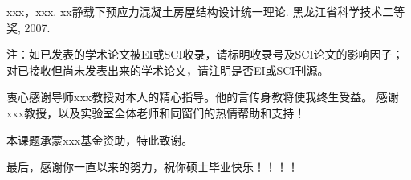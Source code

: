 \documentclass[a4paper, twoside, openany]{NCEPUMaster}
\begin{document}
\begin{achievementlist}
\item[ {[1]} ]
xxx，xxx. xx静载下预应力混凝土房屋结构设计统一理论. 黑龙江省科学技术二等奖, 2007.
\end{achievementlist}

注：如已发表的学术论文被EI或SCI收录，请标明收录号及SCI论文的影响因子；对已接收但尚未发表出来的学术论文，请注明是否EI或SCI刊源。

衷心感谢导师xxx教授对本人的精心指导。他的言传身教将使我终生受益。
感谢xxx教授，以及实验室全体老师和同窗们的热情帮助和支持！

本课题承蒙xxx基金资助，特此致谢。

最后，感谢你一直以来的努力，祝你硕士毕业快乐！！！！
\end{document}
